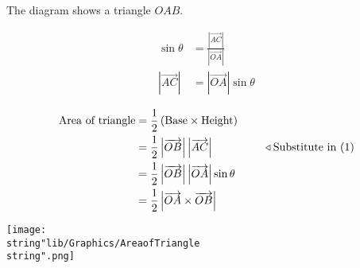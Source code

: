 \documentclass[11pt,a4paper]{book}
\begin{document}
\begin{minipage}[t]{0.65\textwidth}

The diagram shows a triangle $OAB$.

\begin{align*}
\sin\theta & =\frac{\left|\overrightarrow{AC}\right|}{\left|\overrightarrow{OA}\right|}\\
\left|\overrightarrow{AC}\right| & =\left|\overrightarrow{OA}\right|\sin\theta\tag{1}
\end{align*}

\begin{align*}
\text{Area of triangle} & =\frac{1}{2}\left(\text{Base}\times\text{Height}\right)\\
 & =\frac{1}{2}\left|\overrightarrow{OB}\right|\left|\overrightarrow{AC}\right|\hspace{1.6cm}\triangleleft\text{Substitute in \ensuremath{\left(1\right)}}\\
 & =\frac{1}{2}\left|\overrightarrow{OB}\right|\left|\overrightarrow{OA}\right|\sin\theta\\
 & =\frac{1}{2}\left|\overrightarrow{OA}\times\overrightarrow{OB}\right|
\end{align*}

\end{minipage}
\begin{minipage}[t]{0.2\textwidth}
\begin{center}
\texttt{[image: \\string"lib/Graphics/AreaofTriangle\\string".png]}
\par\end{center}

\end{minipage}

\newpage
\end{document}
